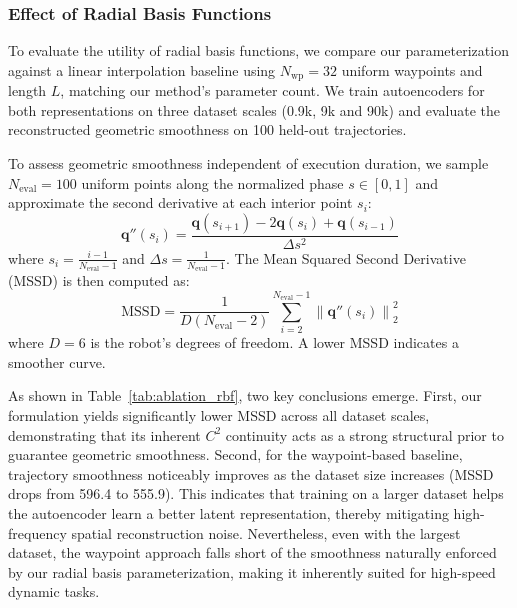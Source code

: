 \documentclass[letterpaper, 10 pt, conference]{ieeeconf}  %
\begin{document}
\subsubsection{Effect of Radial Basis Functions}
To evaluate the utility of radial basis functions, we compare our parameterization against a linear interpolation baseline using $N_{\mathrm{wp}} = 32$ uniform waypoints and length $L$, matching our method's parameter count. We train autoencoders for both representations on three dataset scales (0.9k, 9k and 90k) and evaluate the reconstructed geometric smoothness on 100 held-out trajectories.

To assess geometric smoothness independent of execution duration, we sample $N_{\mathrm{eval}} = 100$ uniform points along the normalized phase $s \in [0,1]$ and approximate the second derivative at each interior point $s_i$:
\begin{equation}
    \mathbf{q}''(s_i) = \frac{\mathbf{q}(s_{i+1}) - 2\mathbf{q}(s_i) + \mathbf{q}(s_{i-1})}{\Delta s^2}
\end{equation}
where $s_i = \frac{i-1}{N_{\mathrm{eval}}-1}$ and $\Delta s = \frac{1}{N_{\mathrm{eval}}-1}$. The Mean Squared Second Derivative (MSSD) is then computed as:
\begin{equation}
    \text{MSSD} = \frac{1}{D(N_{\mathrm{eval}}-2)} \sum_{i=2}^{N_{\mathrm{eval}}-1} \left\| \mathbf{q}''(s_i) \right\|_2^2
\end{equation}
where $D=6$ is the robot's degrees of freedom. A lower MSSD indicates a smoother curve.

As shown in Table~\ref{tab:ablation_rbf}, two key conclusions emerge. First, our formulation yields significantly lower MSSD across all dataset scales, demonstrating that its inherent $C^2$ continuity acts as a strong structural prior to guarantee geometric smoothness. Second, for the waypoint-based baseline, trajectory smoothness noticeably improves as the dataset size increases (MSSD drops from 596.4 to 555.9). This indicates that training on a larger dataset helps the autoencoder learn a better latent representation, thereby mitigating high-frequency spatial reconstruction noise. Nevertheless, even with the largest dataset, the waypoint approach falls short of the smoothness naturally enforced by our radial basis parameterization, making it inherently suited for high-speed dynamic tasks.
\end{document}
